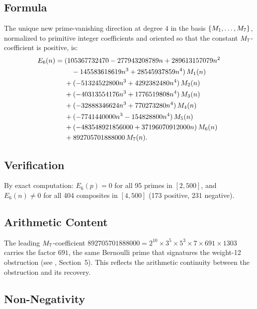\documentclass[11pt]{article}
\begin{document}
\subsection{Formula}

The unique new prime-vanishing direction at degree $4$ in the basis
$\{M_{1},\dots,M_{7}\}$, normalized to primitive integer coefficients and oriented so
that the constant $M_{7}$-coefficient is positive, is:
\begin{equation}
\label{eq:E6}
\begin{aligned}
E_6(n)={}&(105367732470 - 277943208789n + 289613157079n^2 \\
  &\quad{}-145583618619n^3+28545937859n^4)\,M_{1}(n)\\
  &+(-51324522800n^3+4292382480n^4)\,M_{2}(n)\\
  &+(-40313554176n^3+1776519808n^4)\,M_{3}(n)\\
  &+(-32888346624n^3+770273280n^4)\,M_{4}(n)\\
  &+(-7741440000n^3-154828800n^4)\,M_{5}(n)\\
  &+(-483548921856000+37196070912000n)\,M_{6}(n)\\
  &+892705701888000\,M_{7}(n).
\end{aligned}
\end{equation}

\subsection{Verification}

By exact computation: $E_6(p)=0$ for all 95 primes in $[2,500]$, and $E_6(n)\ne 0$ for
all 404 composites in $[4,500]$ (173 positive, 231 negative).

\subsection{Arithmetic Content}

The leading $M_{7}$-coefficient
$892705701888000 = 2^{10}\times 3^5\times 5^3\times 7\times 691\times 1303$
carries the factor $691$, the same Bernoulli prime that signatures the weight-12
obstruction (see \cite{Randsley2025a}, Section~5).
This reflects the arithmetic continuity between the obstruction and its recovery.

\subsection{Non-Negativity}
\end{document}
